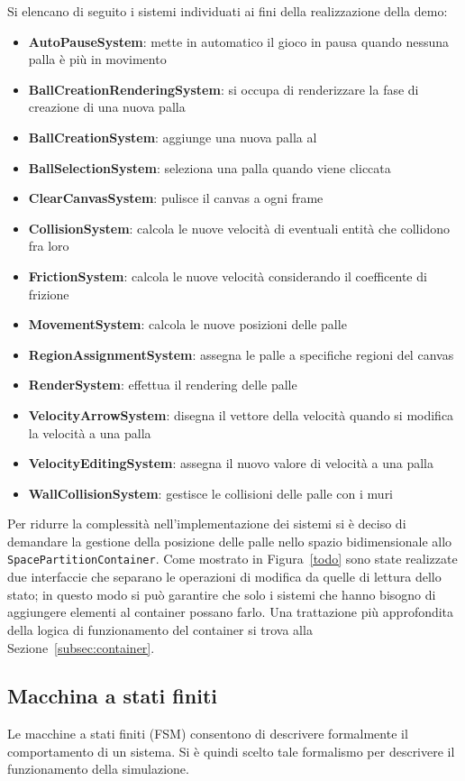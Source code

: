 Si elencano di seguito i sistemi individuati ai fini della realizzazione della demo:
\begin{itemize}
    \item \textbf{AutoPauseSystem}: mette in automatico il gioco in pausa quando nessuna palla è più in movimento
    \item \textbf{BallCreationRenderingSystem}: si occupa di renderizzare la fase di creazione di una nuova palla
    \item \textbf{BallCreationSystem}: aggiunge una nuova palla al \World
    \item \textbf{BallSelectionSystem}: seleziona una palla quando viene cliccata
    \item \textbf{ClearCanvasSystem}: pulisce il canvas a ogni frame
    \item \textbf{CollisionSystem}: calcola le nuove velocità di eventuali entità che collidono fra loro
    \item \textbf{FrictionSystem}: calcola le nuove velocità considerando il coefficente di frizione
    \item \textbf{MovementSystem}: calcola le nuove posizioni delle palle
    \item \textbf{RegionAssignmentSystem}: assegna le palle a specifiche regioni del canvas
    \item \textbf{RenderSystem}: effettua il rendering delle palle
    \item \textbf{VelocityArrowSystem}: disegna il vettore della velocità quando si modifica la velocità a una palla
    \item \textbf{VelocityEditingSystem}: assegna il nuovo valore di velocità a una palla
    \item \textbf{WallCollisionSystem}: gestisce le collisioni delle palle con i muri
\end{itemize}

Per ridurre la complessità nell'implementazione dei sistemi si è deciso di demandare la gestione della posizione delle
palle nello spazio bidimensionale allo \texttt{SpacePartitionContainer}.
Come mostrato in Figura~\ref{todo} sono state realizzate due interfaccie che separano le operazioni di modifica da
quelle di lettura dello stato;
in questo modo si può garantire che solo i sistemi che hanno bisogno di aggiungere elementi al container possano farlo.
Una trattazione più approfondita della logica di funzionamento del container si trova alla Sezione~\ref{subsec:container}.

\subsection{Macchina a stati finiti}\label{subsec:macchina-a-stati-finiti}
Le macchine a stati finiti (FSM) consentono di descrivere formalmente il comportamento di un sistema.
Si è quindi scelto tale formalismo per descrivere il funzionamento della simulazione.

